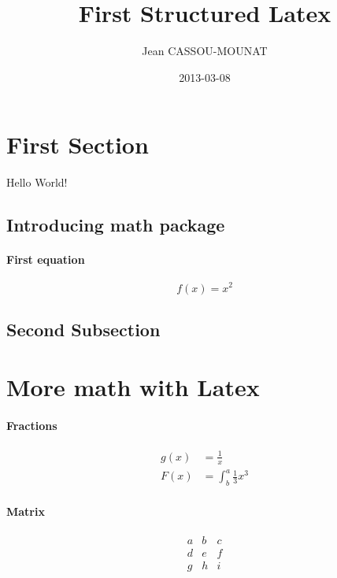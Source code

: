 \documentclass{article}
\title{First Structured Latex}
\date{2013-03-08}
\author{Jean CASSOU-MOUNAT}
\begin{document}
\maketitle
{}
\newpage
{}

\tableofcontents

\section{First Section}

Hello World!

\subsection{Introducing math package}

\paragraph{First equation}

\begin{equation*}
  f(x) = x^2
\end{equation*}

\subsection{Second Subsection}

\section{More math with Latex}

\paragraph{Fractions}

\begin{align*}
  g(x) &= \frac{1}{x}\\
  F(x) &= \int^a_b \frac{1}{3}x^3
\end{align*}

\paragraph{Matrix}

\[
 \begin{matrix}
  a & b & c \\
  d & e & f \\
  g & h & i
 \end{matrix}
\]
\end{document}
